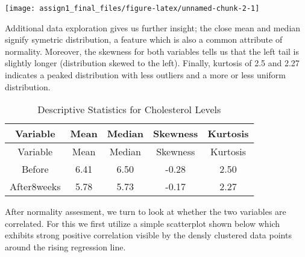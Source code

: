 \documentclass[
]{article}
\newenvironment{Shaded}{\begin{snugshade}}{\end{snugshade}}
\newcommand{\AttributeTok}[1]{\textcolor[rgb]{0.13,0.29,0.53}{#1}}
\newcommand{\CommentTok}[1]{\textcolor[rgb]{0.56,0.35,0.01}{\textit{#1}}}
\newcommand{\DecValTok}[1]{\textcolor[rgb]{0.00,0.00,0.81}{#1}}
\newcommand{\FunctionTok}[1]{\textcolor[rgb]{0.13,0.29,0.53}{\textbf{#1}}}
\newcommand{\NormalTok}[1]{#1}
\newcommand{\SpecialCharTok}[1]{\textcolor[rgb]{0.81,0.36,0.00}{\textbf{#1}}}
\newcommand{\StringTok}[1]{\textcolor[rgb]{0.31,0.60,0.02}{#1}}
\begin{document}
\begin{Shaded}
\end{Shaded}

\begin{center}\texttt{[image: assign1\_final\_files/figure-latex/unnamed-chunk-2-1]} \end{center}

Additional data exploration gives us further insight; the close mean and
median signify symetric distribution, a feature which is also a common
attribute of normality. Moreover, the skewness for both variables tells
us that the left tail is slightly longer (distribution skewed to the
left). Finally, kurtosis of 2.5 and 2.27 indicates a peaked distribution
with less outliers and a more or less uniform distribution.

\begin{longtable}[]{@{}ccccc@{}}
\caption{Descriptive Statistics for Cholesterol Levels}\tabularnewline
\toprule\noalign{}
Variable & Mean & Median & Skewness & Kurtosis \\
\midrule\noalign{}
\endfirsthead
\toprule\noalign{}
Variable & Mean & Median & Skewness & Kurtosis \\
\midrule\noalign{}
\endhead
\bottomrule\noalign{}
\endlastfoot
Before & 6.41 & 6.50 & -0.28 & 2.50 \\
After8weeks & 5.78 & 5.73 & -0.17 & 2.27 \\
\end{longtable}

After normality assesment, we turn to look at whether the two variables
are correlated. For this we first utilize a simple scatterplot shown
below which exhibits strong positive correlation visible by the densly
clustered data points around the rising regression line.
\end{document}
